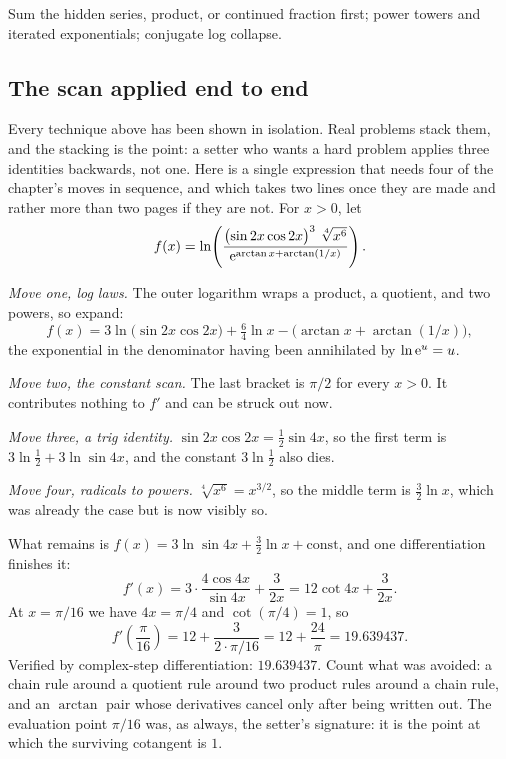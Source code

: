 \begin{seealsob}Sum the hidden series, product, or continued fraction first; power towers and iterated exponentials; conjugate log collapse.\end{seealsob}

\subsection{The scan applied end to end}

Every technique above has been shown in isolation. Real problems stack them, and the stacking is the point: a setter who wants a hard problem applies three identities backwards, not one. Here is a single expression that needs four of the chapter's moves in sequence, and which takes two lines once they are made and rather more than two pages if they are not. For $x>0$, let
\[
f(x)=\ln\!\left(\frac{\bigl(\sin 2x\cos 2x\bigr)^{3}\ \sqrt[4]{x^{6}}}{\mathrm{e}^{\arctan x+\arctan(1/x)}}\right).
\]

\emph{Move one, log laws.} The outer logarithm wraps a product, a quotient, and two powers, so expand:
\[
f(x)=3\ln\bigl(\sin 2x\cos 2x\bigr)+\tfrac{6}{4}\ln x-\bigl(\arctan x+\arctan(1/x)\bigr),
\]
the exponential in the denominator having been annihilated by $\ln\mathrm{e}^{u}=u$.

\emph{Move two, the constant scan.} The last bracket is $\pi/2$ for every $x>0$. It contributes nothing to $f'$ and can be struck out now.

\emph{Move three, a trig identity.} $\sin 2x\cos 2x=\tfrac12\sin 4x$, so the first term is $3\ln\tfrac12+3\ln\sin 4x$, and the constant $3\ln\tfrac12$ also dies.

\emph{Move four, radicals to powers.} $\sqrt[4]{x^{6}}=x^{3/2}$, so the middle term is $\tfrac32\ln x$, which was already the case but is now visibly so.

What remains is $f(x)=3\ln\sin 4x+\tfrac32\ln x+\text{const}$, and one differentiation finishes it:
\[
f'(x)=3\cdot\frac{4\cos 4x}{\sin 4x}+\frac{3}{2x}=12\cot 4x+\frac{3}{2x}.
\]
At $x=\pi/16$ we have $4x=\pi/4$ and $\cot(\pi/4)=1$, so
\[
f'\!\left(\frac{\pi}{16}\right)=12+\frac{3}{2\cdot\pi/16}=12+\frac{24}{\pi}=19.639437 .
\]
Verified by complex-step differentiation: $19.639437$. Count what was avoided: a chain rule around a quotient rule around two product rules around a chain rule, and an $\arctan$ pair whose derivatives cancel only after being written out. The evaluation point $\pi/16$ was, as always, the setter's signature: it is the point at which the surviving cotangent is $1$.

